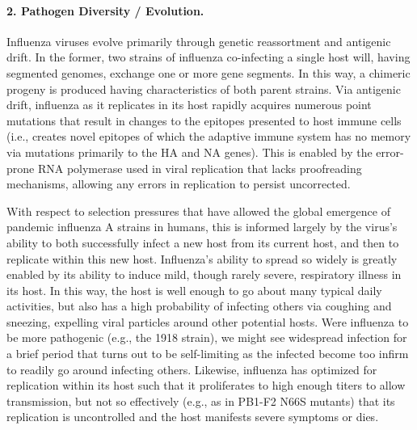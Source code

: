 \documentclass[11pt,letterpaper,final] {article}
\begin{document}
\paragraph{2. Pathogen Diversity / Evolution.} Influenza viruses evolve primarily through genetic reassortment and antigenic drift. In the former, two strains of influenza co-infecting a single host will, having segmented genomes, exchange one or more gene segments. In this way, a chimeric progeny is produced having characteristics of both parent strains. Via antigenic drift, influenza as it replicates in its host rapidly acquires numerous point mutations that result in changes to the epitopes presented to host immune cells (i.e., creates novel epitopes of which the adaptive immune system has no memory via mutations primarily to the HA and NA genes). This is enabled by the error-prone RNA polymerase used in viral replication that lacks proofreading mechanisms, allowing any errors in replication to persist uncorrected.

With respect to selection pressures that have allowed the global emergence of pandemic influenza A strains in humans, this is informed largely by the virus's ability to both successfully infect a new host from its current host, and then to replicate within this new host. Influenza's ability to spread so widely is greatly enabled by its ability to induce mild, though rarely severe, respiratory illness in its host. In this way, the host is well enough to go about many typical daily activities, but also has a high probability of infecting others via coughing and sneezing, expelling viral particles around other potential hosts. Were influenza to be more pathogenic (e.g., the 1918 strain), we might see widespread infection for a brief period that turns out to be self-limiting as the infected become too infirm to readily go around infecting others. Likewise, influenza has optimized for replication within its host such that it proliferates to high enough titers to allow transmission, but not so effectively (e.g., as in PB1-F2 N66S mutants) that its replication is uncontrolled and the host manifests severe symptoms or dies.
\end{document}
